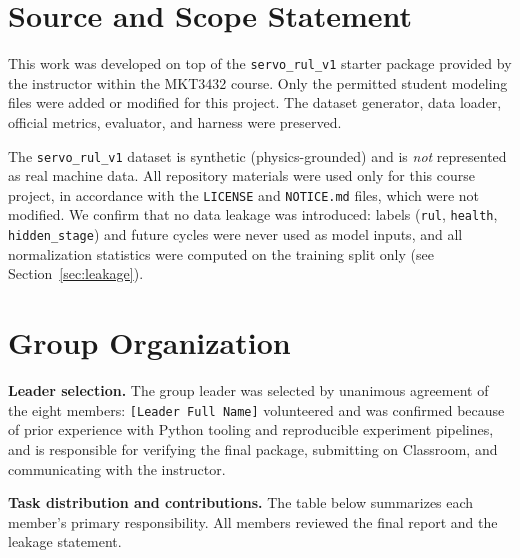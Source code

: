 \documentclass[11pt,a4paper]{article}
\newcommand{\code}[1]{\texttt{\small #1}}
\begin{document}
\tableofcontents
\newpage

\section{Source and Scope Statement}

This work was developed on top of the \code{servo\_rul\_v1} starter package
provided by the instructor within the MKT3432 course. Only the permitted student
modeling files were added or modified for this project. The dataset generator,
data loader, official metrics, evaluator, and harness were preserved.

The \code{servo\_rul\_v1} dataset is synthetic (physics-grounded) and is
\emph{not} represented as real machine data. All repository materials were used
only for this course project, in accordance with the \code{LICENSE} and
\code{NOTICE.md} files, which were not modified. We confirm that no data leakage
was introduced: labels (\code{rul}, \code{health}, \code{hidden\_stage}) and
future cycles were never used as model inputs, and all normalization statistics
were computed on the training split only (see Section~\ref{sec:leakage}).

\section{Group Organization}

\textbf{Leader selection.} The group leader was selected by unanimous agreement
of the eight members: \texttt{[Leader Full Name]} volunteered and was confirmed
because of prior experience with Python tooling and reproducible experiment
pipelines, and is responsible for verifying the final package, submitting on
Classroom, and communicating with the instructor.

\textbf{Task distribution and contributions.} The table below summarizes each
member's primary responsibility. All members reviewed the final report and the
leakage statement.
\end{document}
